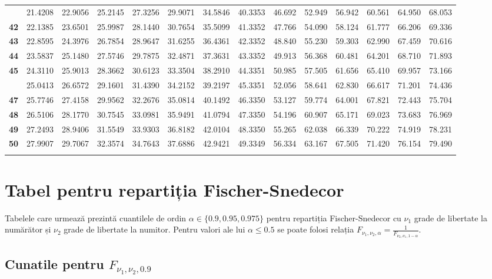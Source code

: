 \documentclass[]{article}
\begin{document}
\begin{longtable}{>{\bfseries}r|rrrrrrrrrrrrr}
\addlinespace
41 & 21.4208 & 22.9056 & 25.2145 & 27.3256 & 29.9071 & 34.5846 & 40.3353 & 46.692 & 52.949 & 56.942 & 60.561 & 64.950 & 68.053\\
42 & 22.1385 & 23.6501 & 25.9987 & 28.1440 & 30.7654 & 35.5099 & 41.3352 & 47.766 & 54.090 & 58.124 & 61.777 & 66.206 & 69.336\\
43 & 22.8595 & 24.3976 & 26.7854 & 28.9647 & 31.6255 & 36.4361 & 42.3352 & 48.840 & 55.230 & 59.303 & 62.990 & 67.459 & 70.616\\
44 & 23.5837 & 25.1480 & 27.5746 & 29.7875 & 32.4871 & 37.3631 & 43.3352 & 49.913 & 56.368 & 60.481 & 64.201 & 68.710 & 71.893\\
45 & 24.3110 & 25.9013 & 28.3662 & 30.6123 & 33.3504 & 38.2910 & 44.3351 & 50.985 & 57.505 & 61.656 & 65.410 & 69.957 & 73.166\\
\addlinespace
46 & 25.0413 & 26.6572 & 29.1601 & 31.4390 & 34.2152 & 39.2197 & 45.3351 & 52.056 & 58.641 & 62.830 & 66.617 & 71.201 & 74.436\\
47 & 25.7746 & 27.4158 & 29.9562 & 32.2676 & 35.0814 & 40.1492 & 46.3350 & 53.127 & 59.774 & 64.001 & 67.821 & 72.443 & 75.704\\
48 & 26.5106 & 28.1770 & 30.7545 & 33.0981 & 35.9491 & 41.0794 & 47.3350 & 54.196 & 60.907 & 65.171 & 69.023 & 73.683 & 76.969\\
49 & 27.2493 & 28.9406 & 31.5549 & 33.9303 & 36.8182 & 42.0104 & 48.3350 & 55.265 & 62.038 & 66.339 & 70.222 & 74.919 & 78.231\\
50 & 27.9907 & 29.7067 & 32.3574 & 34.7643 & 37.6886 & 42.9421 & 49.3349 & 56.334 & 63.167 & 67.505 & 71.420 & 76.154 & 79.490\\*
\end{longtable}

\endgroup{}

\section{Tabel pentru repartiția
Fischer-Snedecor}\label{tabel-pentru-repartitia-fischer-snedecor}

Tabelele care urmează prezintă cuantilele de ordin
\(\alpha\in\{0.9, 0.95, 0.975\}\) pentru repartiția Fischer-Snedecor cu
\(\nu_1\) grade de libertate la numărător și \(\nu_2\) grade de
libertate la numitor. Pentru valori ale lui \(\alpha \leq 0.5\) se poate
folosi relația
\(F_{\nu_1, \nu_2, \alpha} = \frac{1}{F_{\nu_2, \nu_1, 1-\alpha}}\).

\subsection{\texorpdfstring{Cunatile pentru
\(F_{\nu_1, \nu_2, 0.9}\)}{Cunatile pentru F\_\{\textbackslash{}nu\_1, \textbackslash{}nu\_2, 0.9\}}}\label{cunatile-pentru-f_nu_1-nu_2-0.9}
\end{document}
